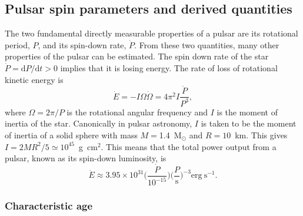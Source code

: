 \subsection{Pulsar spin parameters and derived quantities}
\label{sec: intro - general intro - spin parameters}

The two fundamental directly measurable properties of a pulsar are its rotational period, $P$, and its spin-down rate, $\dot{P}$. From these two quantities, many other properties of the pulsar can be estimated. The spin down rate of the star $\dot{P} = \mathrm{d}P/\mathrm{d}t > 0$ implies that it is losing energy. The rate of loss of rotational kinetic energy is
\begin{equation}
    \label{eq: intro - Edot}
    \dot{E} = -I\Omega\dot{\Omega} = 4\pi^2I\frac{\dot{P}}{P^3},
\end{equation}
where $\Omega = 2\pi/P$ is the rotational angular frequency and $I$ is the moment of inertia of the star. Canonically in pulsar astronomy, $I$ is taken to be the moment of inertia of a solid sphere with mass $M=$1.4~M$_\odot$ and $R=10$~km. This gives $I=2MR^2/5\simeq 10^{45}$~g~cm$^2$. This means that the total power output from a pulsar, known as its spin-down luminosity, is
\begin{equation}
    \label{eq: intro - Edot canonical}
    \dot{E} \approx 3.95\times10^{31} \bigg(\frac{\dot{P}}{10^{-15}}\bigg) \bigg(\frac{P}{\mathrm{s}}\bigg)^{-3} \mathrm{erg\ s}^{-1}.
\end{equation}


\subsubsection*{Characteristic age}
\label{sec: intro - general intro - spin parameters - characteristic age}

